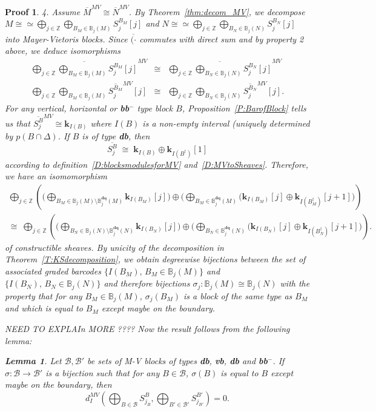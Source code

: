 \documentclass[a4paper, english, 11pt]{article}
\newcommand{\kk}[0]{\textbf{k}}
\newcommand{\0}{\vec{0}}
\newcommand{\Z}[0]{\mathbb{Z}}
\newtheorem*{pf}{Proof} }
\newtheorem{lem}[prop]{Lemma}
\begin{document}
\begin{pf}
4. Assume $\overline{M}^{MV} \cong \overline{N}^{MV}$. By Theorem~\ref{thm:decom_MV}, we decompose 
$M\cong \simeq \bigoplus_{j\in \Z} \bigoplus_{B_M \in \mathbb{B}_j(M)}S_j^{B_M}[j]$ and 
$N \cong \simeq \bigoplus_{j\in \Z} \bigoplus_{B_N \in \mathbb{B}_j(N)}S_j^{B_N}[j]$ into  Mayer-Vietoris blocks.
Since $\overline{(\cdot}$ commutes with direct 
sum and by property 2 above,  we deduce isomorphisms
\begin{eqnarray*}
 \overline{ \bigoplus_{j\in \Z} \bigoplus_{B_M\in \mathbb{B}_j(M)}S_j^{B_M}[j]}^{MV} &\cong&
 \overline{\bigoplus_{j\in \Z} \bigoplus_{B_N\in \mathbb{B}_j(N)}S_j^{B_N}[j] }^{MV}  \\ 
 \bigoplus_{j\in \Z} \bigoplus_{B_M\in \mathbb{B}_j(M)} \overline{S_j^{B_M}}^{MV}[j] &\cong& 
 \bigoplus_{j\in \Z} \bigoplus_{B_N\in \mathbb{B}_j(N)} \overline{S_j^{B_N} }^{MV}[j].
\end{eqnarray*}
For any vertical, horizontal or \textbf{bb}$^-$ type block $B$, Proposition~\ref{P:BarofBlock} tells us that  
$\overline{S_j^{B}}^{MV} \cong \kk_{I(B)}$ where $I(B)$ is a non-empty interval (uniquely determined by $p(B\cap \Delta)$. 
If $B$ is of type \textbf{db}, then 
$$
 \overline{S_j^{B}} \; \cong \;  \kk_{I(B)} \oplus \kk_{I(B^\dag)}[1]
$$
according to definition~\ref{D:blocksmodulesforMV} and~\ref{D:MVtoSheaves}.  
Therefore, we have an isomomorphism 
\begin{multline}
 \label{eq:decofBarMV} 
 \bigoplus_{j\in \Z} \left(\Big(\bigoplus_{B_M\in \mathbb{B}_j(M)\setminus \mathbb{B}^{\textbf{dq}}_j(M)} \kk_{I(B_M)}[j] \Big) \oplus 
 \Big(\bigoplus_{B_M\in \mathbb{B}^{\textbf{dq}}_j(M) } \big(\kk_{I(B_M)}[j] \oplus \kk_{I(B_M^\dag)}[j+1]\Big)\right)\\
 \cong \; 
 \bigoplus_{j\in \Z} \left(\Big(\bigoplus_{B_N\in \mathbb{B}_j(N) \setminus \mathbb{B}^{\textbf{dq}}_j(N)} \kk_{I(B_N)}[j]\Big)\oplus 
\Big( \bigoplus_{B_N\in \mathbb{B}^{\textbf{dq}}_j(N) } \big(\kk_{I(B_N)}[j] \oplus \kk_{I(B_N^\dag)}[j+1]\Big)\right).
\end{multline}
of constructible sheaves. By unicity of the decomposition in Theorem~\ref{T:KSdecomposition}, we obtain  degreewise bijections between 
the set of associated graded barcodes $\{ I(B_M), \, B_M \in  \mathbb{B}_j(M)\}$ and $\{ I(B_N), \, B_N \in  \mathbb{B}_j(N)\}$
and therefore  bijections $\sigma_j: \mathbb{B}_j(M) \cong \mathbb{B}_j(N)$ with the property that  for any $B_M\in \mathbb{B}_j(M)$, 
$\sigma_j(B_M)$ is a block of the same type as $B_M$ and which is equal to $B_M$ except maybe on the boundary.

NEED TO EXPLAIn MORE ???? 
Now the result follows from the  following lemma:
\begin{lem} Let $\mathcal{B}, \mathcal{B}'$ be sets of M-V blocks of types \textbf{db}, \textbf{vb}, \textbf{db} and \textbf{bb}$^-$. 
If $\sigma: \mathcal{B} \to \mathcal{B}'$ is a bijection such that for any $B\in \mathcal{B}$, $\sigma(B)$ is equal to $B$ except maybe on the boundary, then 
$$d_I^{MV}\left(\bigoplus_{B\in \mathcal{B}} S^B_{j_B}, \bigoplus_{B'\in \mathcal{B}'} S^{B'}_{j_{B'}}\right) =0.$$
\end{lem}


\end{pf}
\end{document}
